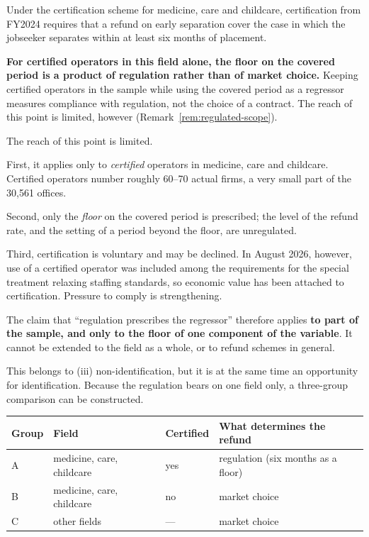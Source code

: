 Under the certification scheme for medicine, care and childcare, certification from FY2024
requires that a refund on early separation cover the case in which the jobseeker separates within
at least six months of placement.

\textbf{For certified operators in this field alone, the floor on the covered period is a product
of regulation rather than of market choice.} Keeping certified operators in the sample while
using the covered period as a regressor measures compliance with regulation, not the choice of a
contract. The reach of this point is limited, however (Remark~\ref{rem:regulated-scope}).

\begin{remark}
\label{rem:regulated-scope}
The reach of this point is limited.

First, it applies only to \emph{certified} operators in medicine, care and childcare. Certified
operators number roughly 60--70 actual firms, a very small part of the 30,561 offices.

Second, only the \emph{floor} on the covered period is prescribed; the level of the refund rate,
and the setting of a period beyond the floor, are unregulated.

Third, certification is voluntary and may be declined. In August 2026, however, use of a certified
operator was included among the requirements for the special treatment relaxing staffing
standards, so economic value has been attached to certification. Pressure to comply is
strengthening.

The claim that ``regulation prescribes the regressor'' therefore applies \textbf{to part of the
sample, and only to the floor of one component of the variable}. It cannot be extended to the
field as a whole, or to refund schemes in general.
\end{remark}

This belongs to (iii) non-identification, but it is at the same time an opportunity for
identification. Because the regulation bears on one field only, a three-group comparison can be
constructed.

\begin{center}
\begin{tabular}{@{}llll@{}}
\toprule
Group & Field & Certified & What determines the refund \\
\midrule
A & medicine, care, childcare & yes & regulation (six months as a floor) \\
B & medicine, care, childcare & no & market choice \\
C & other fields & --- & market choice \\
\bottomrule
\end{tabular}
\label{tab:predB-groups}
\end{center}

